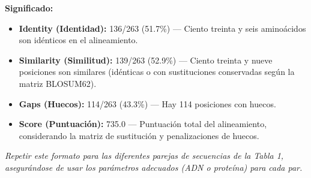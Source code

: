 \documentclass[fleqn,10pt]{article}
\begin{document}
    \textbf{Significado:}  
    \begin{itemize}
        \item \textbf{Identity (Identidad):} 136/263 (51.7\%) --- Ciento treinta y seis aminoácidos son idénticos en el alineamiento.
        \item \textbf{Similarity (Similitud):} 139/263 (52.9\%) --- Ciento treinta y nueve posiciones son similares (idénticas o con sustituciones conservadas según la matriz BLOSUM62).
        \item \textbf{Gaps (Huecos):} 114/263 (43.3\%) --- Hay 114 posiciones con huecos.
        \item \textbf{Score (Puntuación):} 735.0 --- Puntuación total del alineamiento, considerando la matriz de sustitución y penalizaciones de huecos.
    \end{itemize}

    \textit{Repetir este formato para las diferentes parejas de secuencias de la Tabla 1, asegurándose de usar los parámetros adecuados (ADN o proteína) para cada par.}
\end{document}
